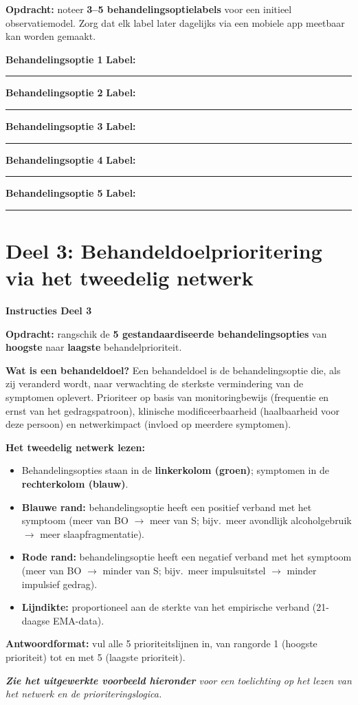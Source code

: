 \documentclass[11pt,a4paper]{article}
\newcommand{\behandelingsoptieslot}[1]{%
\vspace{0.25em}\noindent
\begin{tcolorbox}[colback=SoftBG,colframe=BorderGrey,boxrule=0.4pt,arc=1.5mm,left=8pt,right=8pt,top=5pt,bottom=5pt]%
\small\textbf{\color{SlateMid}Behandelingsoptie #1}\hspace{1em}%
\textbf{Label:}\hspace{0.5em}\rule{0.56\linewidth}{0.25pt}%
\end{tcolorbox}%
}
\begin{document}
\begin{responsebox}[title={Uw antwoord -- Deel 2}]
\small\textbf{Opdracht:} noteer \textbf{3--5 behandelingsoptielabels} voor een initieel observatiemodel.
Zorg dat elk label later dagelijks via een mobiele app meetbaar kan worden gemaakt.

\behandelingsoptieslot{1}
\behandelingsoptieslot{2}
\behandelingsoptieslot{3}
\behandelingsoptieslot{4}
\behandelingsoptieslot{5}
\end{responsebox}

\vspace{0.6em}
\newpage


\section{Deel 3: Behandeldoelprioritering via het tweedelig netwerk}

\begin{tcolorbox}[colback=yellow!5,colframe=GoldAmber,arc=2.5mm,boxrule=0.9pt,
  left=10pt,right=10pt,top=9pt,bottom=9pt]
\textbf{\color{GoldAmber}Instructies Deel 3}

\smallskip\small
\textbf{Opdracht:} rangschik de \textbf{5 gestandaardiseerde behandelingsopties} van
\textbf{hoogste} naar \textbf{laagste} behandelprioriteit.

\textbf{Wat is een behandeldoel?}
Een behandeldoel is de behandelingsoptie die, als zij veranderd wordt, naar verwachting de
sterkste vermindering van de symptomen oplevert. Prioriteer op basis van monitoringbewijs
(frequentie en ernst van het gedragspatroon), klinische modificeerbaarheid
(haalbaarheid voor deze persoon) en netwerkimpact (invloed op meerdere symptomen).

\textbf{Het tweedelig netwerk lezen:}
\begin{itemize}[topsep=2pt,itemsep=1pt]
\item Behandelingsopties staan in de \textbf{linkerkolom (groen)}; symptomen in de \textbf{rechterkolom (blauw)}.
\item \textbf{Blauwe rand:} behandelingsoptie heeft een positief verband met het symptoom
(meer van BO $\rightarrow$ meer van S; bijv.\ meer avondlijk alcoholgebruik $\rightarrow$ meer slaapfragmentatie).
\item \textbf{Rode rand:} behandelingsoptie heeft een negatief verband met het symptoom
(meer van BO $\rightarrow$ minder van S; bijv.\ meer impulsuitstel $\rightarrow$ minder impulsief gedrag).
\item \textbf{Lijndikte:} proportioneel aan de sterkte van het empirische verband
(21-daagse EMA-data).
\end{itemize}

\textbf{Antwoordformat:} vul alle 5 prioriteitslijnen in, van rangorde 1 (hoogste prioriteit)
tot en met 5 (laagste prioriteit).

\medskip
\textit{\textbf{Zie het uitgewerkte voorbeeld hieronder} voor een toelichting op het lezen van het netwerk en de prioriteringslogica.}
\end{tcolorbox}
\end{document}
